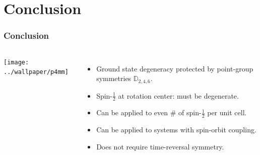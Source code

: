 \documentclass[xcolor=table, 10pt, aspectratio=43]{beamer}
\begin{document}
\section{Conclusion}

\begin{frame}
  \frametitle{Conclusion}
  \begin{columns}
    \begin{center}
      \texttt{[image: ../wallpaper/p4mm]}
    \end{center}
    \begin{itemize}
      \item Ground state degeneracy protected by point-group symmetries $\mathbb D_{2,4,6}$.
      \item Spin-$\frac12$ at rotation center: must be degenerate.
      \item Can be applied to even \# of spin-$\frac12$ per unit cell.
      \item Can be applied to systems with spin-orbit coupling.
      \item Does not require time-reversal symmetry.
    \end{itemize}
  \end{columns}
\end{frame}
\end{document}
